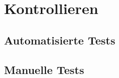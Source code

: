 \chapter{Kontrollieren}
\section{Automatisierte Tests}
\label{sec:automated-tests}

\section{Manuelle Tests}
\label{sec:manual-tests}
